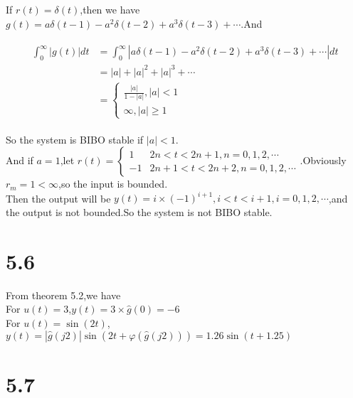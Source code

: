 \documentclass{article}
\begin{document}
If $r(t)=\delta (t)$,then we have $g(t)=a\delta(t-1)-a^2\delta(t-2)+a^3\delta(t-3)+\cdots $.And\\
\begin{center}
    \begin{eqnarray*}\begin{split}
    \int_0^\infty \left|g(t)\right| dt&=\int_0^\infty \left|a\delta(t-1)-a^2\delta(t-2)+a^3\delta(t-3)+\cdots\right| dt\\
    &=|a|+|a|^2+|a|^3+\cdots\\
    &=\left\{\begin{array}{l}\frac{|a|}{1-|a|},|a|<1\\
    \infty,|a|\geq 1\end{array}\right.
    \end{split}\end{eqnarray*}
\end{center}

So the system is BIBO stable if $|a|<1$.\\

And if $a=1$,let $r(t)=\left\{\begin{array}{ll} 1 & 2n<t<2n+1,n=0,1,2,\cdots\\
-1 & 2n+1<t<2n+2,n=0,1,2,\cdots\end{array}\right.$.Obviously $r_m=1<\infty$,so the input is bounded.\\

Then the output will be $y(t)=i\times (-1)^{i+1},i<t<i+1,i=0,1,2,\cdots$,and the output is not bounded.So the system is not BIBO stable.\\

\section*{5.6}

From theorem 5.2,we have\\

For $u(t)=3$,$y(t)=3\times \hat{g}(0)=-6$\\

For $u(t)=\sin(2t)$,$y(t)=\left|\hat{g}(j2)\right|\sin(2t+\varphi (\hat{g}(j2)))=1.26\sin(t+1.25)$\\

\section*{5.7}
\end{document}
